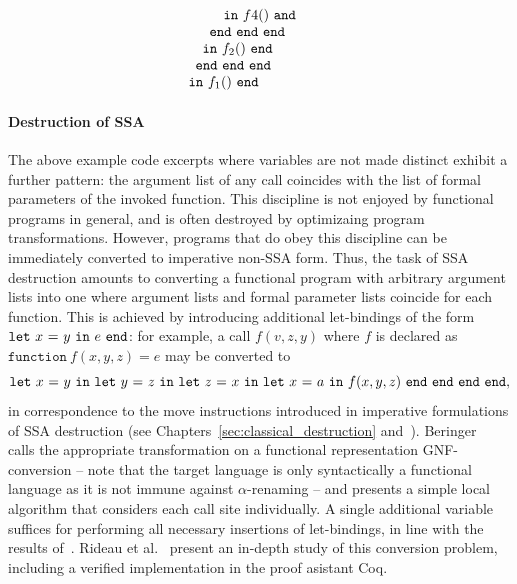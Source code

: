 \begin{equation}
\begin{array}{l}
\begin{array}{l}
\begin{array}[t]{l}
\begin{array}{l}
\begin{array}[t]{l}
\begin{array}[t]{l}
\begin{array}{l}
                 \end{array}\\
                 \mathtt{in}\ f4()\ \mathtt{and}
               \end{array}
           \end{array}\\
           \mathtt{end\ end\ end}
         \end{array}\\
     \mathtt{in}\ f_2()\ \mathtt{end}
     \end{array}\\
     \mathtt{end\ end\ end}\\
   \end{array}\\
\mathtt{in}\ f_1()\  \mathtt{end}
\end{array}
\end{equation}

\paragraph{Destruction of SSA}

The above example code excerpts where variables are not made distinct
exhibit a further pattern: the argument list of any call coincides
with the list of formal parameters of the invoked function. This
discipline is not enjoyed by functional programs in general, and is
often destroyed by optimizaing program transformations. However,
programs that do obey this discipline can be immediately converted to
imperative non-SSA form. Thus, the task of SSA destruction amounts to
converting a functional program with arbitrary argument lists into one
where argument lists and formal parameter lists coincide for each
function. This is achieved by introducing additional let-bindings of
the form $\mathtt{let}\ {x}\ \mathtt{=}\ {y}\ \mathtt{in}\ {e}\ \mathtt{end}$: for example, a call $f(v,z,y)$ where $f$ is
declared as $\mathtt{function}\ f(x,y,z) = e$ may be converted to
$$\mathtt{let}\ {x}\ \mathtt{=}\ {y}\ \mathtt{in}\ {\mathtt{let}\ {y}\ \mathtt{=}\ {z}\ \mathtt{in}\ {\mathtt{let}\ {z}\ \mathtt{=}\ {x}\ \mathtt{in}\ {\mathtt{let}\ {x}\ \mathtt{=}\ {a}\ \mathtt{in}\ {f(x,y,z)}\ \mathtt{end}}\ \mathtt{end}}\ \mathtt{end}}\ \mathtt{end},$$ in
correspondence to the move instructions introduced in imperative
formulations of SSA destruction (see
Chapters~\ref{sec:classical_destruction}
and~\cite{DestructionChapter}).
Beringer~\cite{DBLP:journals/entcs/Beringer07} calls the appropriate
transformation on a functional representation GNF-conversion -- note
that the target language is only syntactically a functional language
as it is not immune against $\alpha$-renaming -- and presents a simple
local algorithm that considers each call site individually. A single
additional variable suffices for performing all necessary insertions
of let-bindings, in line with the results of~\cite{May}. Rideau et
al.~\cite{DBLP:journals/jar/RideauSL08} present an in-depth study of
this conversion problem, including a verified implementation in the
proof asistant Coq.

